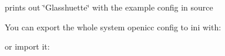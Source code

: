 prints out \char`\"{}\+Glasshuette\char`\"{} with the example config in source

You can export the whole system openicc config to ini with\+:


\begin{DoxyCode}{0}
\end{DoxyCode}


or import it\+:


\begin{DoxyCode}{0}
\end{DoxyCode}
 